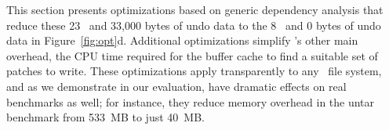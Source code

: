 This section presents optimizations based on generic
dependency analysis that reduce these 23 \patches\ and 33,000 bytes
of undo data to the 8 \patches\ and 0 bytes of
undo data in Figure~\ref{fig:opt}d.
%
Additional optimizations simplify \Kudos's other main overhead, the CPU
time required for the buffer cache to find a suitable set of patches to
write.
%
These optimizations apply transparently to any \Kudos\ file system, and as
we demonstrate in our evaluation, have dramatic effects on real benchmarks
as well; for instance, they reduce memory overhead in the untar benchmark
from 533~MB to just 40~MB.

\begin{comment}

Challenges in a \patch-based file system implementation include:

\textbf{Buffer cache graph traversal.}
%
In order to evict and write a block, the buffer cache must choose a block
$b$,
%
and then find a set of \patches\ $P_b \subseteq \PMem[b]$ whose dependencies
satisfy a graph property, namely that $\PDepset{P_b} \subseteq P_b \cup
\PDisk$.
%
It usually makes sense to define $P_b$ maximally---that is, as the
\emph{largest} corresponding set of \patches.
%
In the ideal (and common) case $P_b = \PMem[b]$, which lets the cache reuse
$b$'s memory once $P_b$ is committed to disk.  However, in some cases there
may be no block for which $P_b = \PMem[b]$.
%
It would also be nice if the blocks chosen for writing also maximized the
disk's commit rate, by minimizing seeks and so forth.

A naive implementation might calculate, for each in-memory block $b$, the
largest set of \patches\ $P_b \subseteq \PMem[b]$ with $\PDepset{P_b}
\subseteq P_b \cup \PDisk$, then evict some block close to previously
written blocks and with few reverted \patches\ (where $\PMem[b] - P_b$
is small).
%
This, however, would be extraordinarily expensive.
%
Finding $P_b$ requires traversing a dependency graph which might contain
thousands and thousands of nodes.
%
Doing so for each block, once per eviction, would take huge amounts of CPU
time.


\textbf{Undo memory usage.}
%
Only a small fraction of \patches\ will ever need to be reverted.
%
For example, most data writes never need to be reverted in any file
system.
%
If a \patch\ won't be reverted under any circumstances, the memory and
CPU time spent to preserve the old version is wasted.


\textbf{\Patch\ memory usage.}
%
\Patches\ themselves take up memory and require time to allocate, free, and
traverse.
%
If two \patches\ have redundant dependencies, it would be faster to combine
them.




The next section tackles all of these challenges.
\end{comment}



